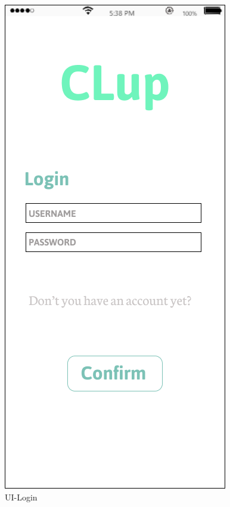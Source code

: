 \documentclass[a4paper,12pt]{report}
\begin{document}
\begin{figure}[H]
	\begin{minipage}[t]{0.5\linewidth}
		\centering
		\includegraphics[scale=0.5]{UI-Login.png}
		\caption{UI-Login}
		\label{UI-Login}
	\end{minipage}%
	\begin{minipage}[t]{0.5\linewidth}
		\centering

\end{minipage}
\end{figure}
\end{document}
